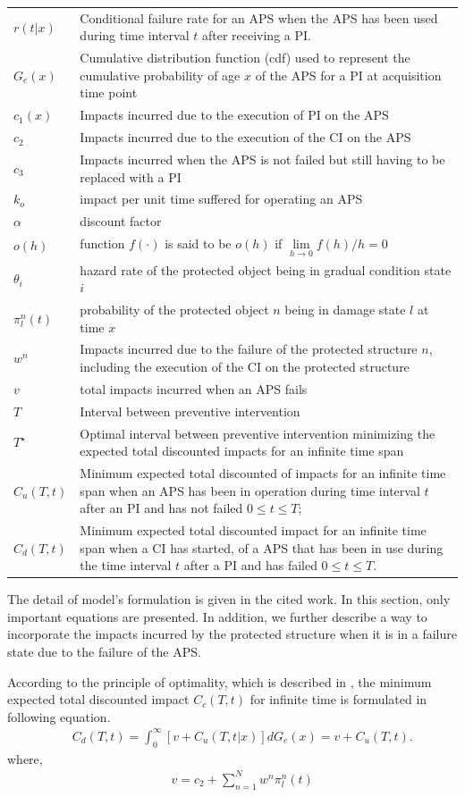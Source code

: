 \documentclass[]{article}
\begin{document}
\begin{tabular}{lp{12.5cm}}
$r(t|x)$  & Conditional failure rate for an APS when the APS has been used during time interval $t$ after receiving a PI.
 \tabularnewline
 $G_e(x)$  & Cumulative distribution function (cdf) used to represent the cumulative
probability of age $x$ of the APS for a PI at acquisition time point\tabularnewline
$c_{1}(x)$  & Impacts incurred due to the execution of PI on
the APS\tabularnewline
$c_{2}$  & Impacts incurred due to the execution of the CI
on the APS\tabularnewline
$c_{3}$  & Impacts incurred when the APS is not failed but still having to be replaced with a PI \tabularnewline
$k_{o}$  & impact per unit time suffered for operating an APS
 \tabularnewline
$\alpha$  & discount factor\tabularnewline
$o(h)$  & function $f( \cdot )$ is said to be $o(h)$ if $\mathop {\lim }\limits_{h \to 0} f(h)/h =0$ \tabularnewline
$\theta_i$  & hazard rate of the protected object being in gradual condition state $i$ \tabularnewline
$\pi_{l}^{n}(t)$  & probability of the protected object $n$ being in damage state $l$ at
time $x$\tabularnewline
$w^{n}$  & Impacts incurred due to the failure of the protected
structure $n$, including the execution of the CI on the protected structure \tabularnewline
$v$  & total impacts incurred when an APS fails \tabularnewline
$T$  & Interval between preventive intervention\tabularnewline
$T^{\star}$  & Optimal interval between preventive intervention minimizing the expected total discounted impacts for an infinite time span \tabularnewline
$C_{u}(T,t)$  & Minimum expected total discounted of impacts for an infinite time span when an APS has been in operation during time interval $t$ after an PI and has not failed $0\le t\le T$;
\tabularnewline
$C_{d}(T,t)$  & Minimum expected total discounted impact for an infinite time span when a CI has started, of a APS that has been in use during the time interval $t$ after a PI and has failed $0\le t\le T$.
\tabularnewline
\end{tabular}

The detail of model's formulation is given in the cited work. In this section, only important equations are presented. In addition, we further describe a way to incorporate the impacts incurred by the protected structure when it is in a failure state due to the failure of the APS. 

%
According to the principle of optimality, which is described in \citet[p. 15]{Bellman1962},
the minimum expected total discounted impact $C_{c}(T,t)$ for
infinite time is formulated in following equation. 
\begin{eqnarray}
 &  & C_{d}(T,t)=\int_{0}^{\infty}\left[{v}+C_{u}(T,t|x)\right]dG_e(x) = v+C_{u}(T,t).\label{omegaCI1}
\end{eqnarray}
where,
\begin{eqnarray}
 &  & v=c_2+\sum_{n=1}^N w^n \pi_l^n(t)
\end{eqnarray}
\end{document}
